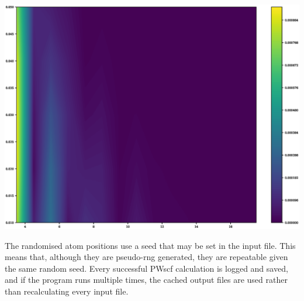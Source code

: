 \begin{center}
\includegraphics[scale=0.35]{chapters/methodology_interatomic_potentials/qeconverge/kpoints_energy_kpointconv_ry_colour}
\end{center}

The randomised atom positions use a seed that may be set in the input file.  This means that, although they are pseudo-rng generated, they are repeatable given the same random seed.  Every successful PWscf calculation is logged and saved, and if the program runs multiple times, the cached output files are used rather than recalculating every input file.















